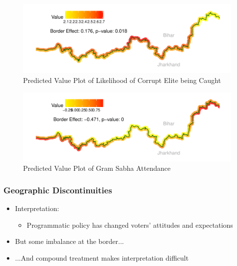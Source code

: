 \documentclass[xcolor=x11names,compress]{beamer}\usepackage[]{graphicx}\usepackage[]{color}
\makeatletter
\def\maxwidth{ %
  \ifdim\Gin@nat@width>\linewidth
    \linewidth
  \else
    \Gin@nat@width
  \fi
}
\renewcommand{\(}{\begin{columns}}
\renewcommand{\)}{\end{columns}}
\newcommand{\<}[1]{\begin{column}{#1}}
\renewcommand{\>}{\end{column}}
\makeatother
\begin{document}
\begin{frame}
\begin{figure}
\includegraphics[width=\maxwidth]{figure/rdd_map_accountability_elite-1} \caption[Predicted Value Plot of Likelihood of Corrupt Elite being Caught]{Predicted Value Plot of Likelihood of Corrupt Elite being Caught}\label{fig:rdd_map_accountability_elite}
\end{figure}
\end{frame}

\begin{frame}
\begin{figure}
\includegraphics[width=\maxwidth]{figure/rdd_map_sabha_att-1} \caption[Predicted Value Plot of Gram Sabha Attendance]{Predicted Value Plot of Gram Sabha Attendance}\label{fig:rdd_map_sabha_att}
\end{figure}
\end{frame}

\begin{frame}
\frametitle{Geographic Discontinuities}
\begin{itemize}
\item Interpretation:
\begin{itemize}
\item Programmatic policy has changed voters' attitudes and expectations
\end{itemize}
\item But some imbalance at the border...
\pause
\item ...And compound treatment makes interpretation difficult
\end{itemize}
\end{frame}
\end{document}
